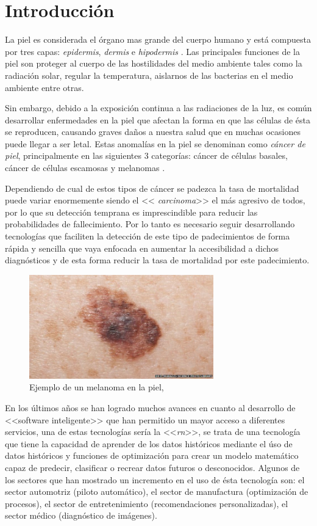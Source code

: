 
\chapter{Introducción}

La piel es considerada el órgano mas grande del cuerpo humano y está compuesta por tres capas: \emph{\gls{epidermis}}, \emph{\gls{dermis}} e \emph{\gls{hipodermis}} \cite{skin_1}. Las principales funciones de la piel son proteger al cuerpo de las hostilidades del medio ambiente tales como la radiación solar,  regular la temperatura, aislarnos de las bacterias en el medio ambiente entre otras.

Sin embargo, debido a la exposición continua a las radiaciones de la luz, es común desarrollar enfermedades en la piel que afectan la forma en que las células de ésta se reproducen, causando graves daños a nuestra salud que en muchas ocasiones puede llegar a ser letal. Estas anomalías en la piel se denominan como \emph{cáncer de piel}, principalmente en las siguientes 3 categorías: cáncer de células basales, cáncer de células escamosas y melanomas \citep{cancer_org}.

Dependiendo de cual de estos tipos de cáncer se padezca la tasa de mortalidad puede variar enormemente siendo el << \emph{carcinoma}>> el más agresivo de todos, por lo que su detección temprana es imprescindible para reducir las probabilidades de fallecimiento. Por lo tanto es necesario seguir desarrollando tecnologías que faciliten la detección de este tipo de padecimientos de forma rápida y sencilla que vaya enfocada en aumentar la accesibilidad a dichos diagnósticos y de esta forma reducir la tasa de mortalidad por este padecimiento.


\begin{figure}[h!]
    \includegraphics[width=80mm, scale = 0.8]{Figuras/skin_cancer_bbc.jpg}
    \centering
    \caption{Ejemplo de un melanoma en la piel, }
    \label{fig:can_jpg}
\end{figure}

En los últimos años se han logrado muchos avances en cuanto al desarrollo de <<software inteligente>> que han permitido un mayor acceso a diferentes servicios, una de estas tecnologías sería la <<\emph{\gls{rn}}>>, se trata de una tecnología que tiene la capacidad de aprender de los datos históricos mediante el úso de datos históricos y funciones de optimización para crear un modelo matemático capaz de predecir, clasificar o recrear datos futuros o desconocidos. Algunos de los sectores que han mostrado un incremento en el uso de ésta tecnología son: el sector automotriz (piloto automático), el sector de manufactura (optimización de procesos), el sector de entretenimiento (recomendaciones personalizadas), el sector médico (diagnóstico de imágenes). 


